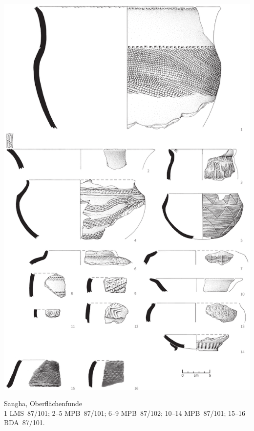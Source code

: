 \begin{pl}[H]
	\includegraphics{plt/Taf62.pdf}
	\vspace{.75em}\caption{\mbox{Sangha}, Oberflächenfunde \\ 1 LMS~87/101; 2--5 MPB~87/101; 6--9 MPB~87/102; 10--14 MPB~87/101; 15--16 BDA~87/101.}
	\label{pl:62}
\end{pl}


